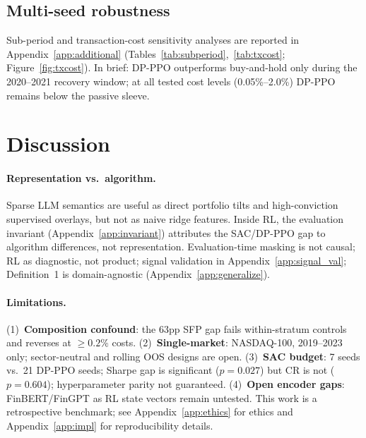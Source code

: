 \documentclass{article}
\begin{document}


\subsection{Multi-seed robustness}
\label{sec:seed_robust}
\label{app:seeds}

Sub-period and transaction-cost sensitivity analyses are reported in Appendix~\ref{app:additional} (Tables~\ref{tab:subperiod},~\ref{tab:txcost}; Figure~\ref{fig:txcost}).
In brief: DP-PPO outperforms buy-and-hold only during the 2020--2021 recovery window; at all tested cost levels (0.05\%–2.0\%) DP-PPO remains below the passive sleeve.

\section{Discussion}
\label{sec:discussion}

\paragraph{Representation vs.\ algorithm.}
Sparse LLM semantics are useful as direct portfolio tilts and high-conviction supervised overlays, but not as naive ridge features.
Inside RL, the evaluation invariant (Appendix~\ref{app:invariant}) attributes the SAC/DP-PPO gap to algorithm differences, not representation.
Evaluation-time masking is not causal; RL as diagnostic, not product; signal validation in Appendix~\ref{app:signal_val}; Definition~1 is domain-agnostic (Appendix~\ref{app:generalize}).

\paragraph{Limitations.}
(1)~\textbf{Composition confound}: the 63pp SFP gap fails within-stratum controls and reverses at ${\geq}0.2\%$ costs.
(2)~\textbf{Single-market}: NASDAQ-100, 2019--2023 only; sector-neutral and rolling OOS designs are open.
(3)~\textbf{SAC budget}: 7 seeds vs.\ 21 DP-PPO seeds; Sharpe gap is significant ($p{=}0.027$) but CR is not ($p{=}0.604$); hyperparameter parity not guaranteed.
(4)~\textbf{Open encoder gaps}: FinBERT/FinGPT as RL state vectors remain untested.
This work is a retrospective benchmark; see Appendix~\ref{app:ethics} for ethics and Appendix~\ref{app:impl} for reproducibility details.
\end{document}
